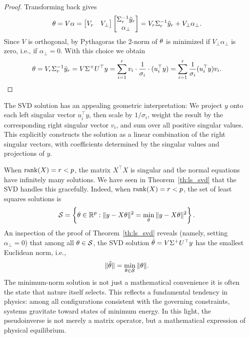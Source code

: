 \begin{proof}
Transforming back gives
$$
 \theta = V\alpha = \begin{bmatrix} V_r & V_{\perp} \end{bmatrix} \begin{bmatrix} \Sigma_r^{-1}\tilde{y}_r \\ \alpha_{\perp}  \end{bmatrix}  =  V_r \Sigma_r^{-1}\tilde{y}_r + V_{\perp} \alpha_{\perp}.
$$  
Since $V$ is orthogonal, by Pythagoras the 2-norm of $\theta$ is minimized
if $V_{\perp} \alpha_{\perp}$ is zero, i.e., if $\alpha_{\perp} =0$.
With this choice we obtain
$$
 \theta =  V_r \Sigma_r^{-1}\tilde{y}_r  
  = V\Sigma^+U^\top y
  = \sum_{i=1}^r v_i \cdot \frac{1}{\sigma_i} \cdot (u_i^\top y)
  = \sum_{i=1}^r \frac{1}{\sigma_i}(u_i^\top y)v_i.
  $$


\end{proof}

The SVD solution has an appealing geometric interpretation: We project $y$ onto each left singular vector $u_i^\top y$, then scale by $1/\sigma_i$, weight the result by the corresponding right singular vector $v_i$, and sum over all positive singular values. This explicitly constructs the solution as a linear combination of the right singular  vectors, with coefficients determined by the singular values and projections of $y$.



\begin{remark}
When $\operatorname{rank}(X) = r < p$, the matrix $X^\top X$ is singular and the normal equations have infinitely many solutions. We have seen in Theorem~\ref{th:ls_svd}  that the SVD handles this gracefully. Indeed,  when $\operatorname{rank}(X) = r < p$, the set of least squares solutions is
$$\mathcal{S} = \left\{\theta \in \mathbb{R}^p : \|y - X\theta\|^2 = \min_{\theta} 
\|y - X\theta\|^2\right\}.$$
An inspection of the proof of Theorem~\ref{th:ls_svd} reveals (namely, setting
$\alpha_{\perp} = 0$) that among all $\theta \in \mathcal{S}$, 
the SVD solution $\hat{\theta} = V\Sigma^+U^\top y$ 
has the smallest Euclidean norm, i.e.,
$$\|\hat{\theta}\| = \min_{\theta \in \mathcal{S}} \|\theta\|.$$ 
The minimum-norm solution is not just a mathematical convenience it is often the state that nature itself selects. This reflects a fundamental tendency in physics: among all configurations consistent with the governing constraints, systems gravitate toward states of minimum energy. In this light, the pseudoinverse is not merely a matrix operator, but a mathematical expression of physical equilibrium.
\end{remark}


